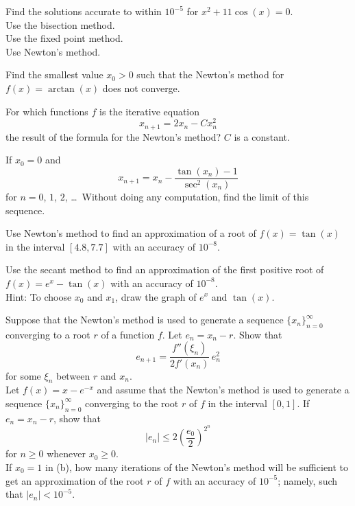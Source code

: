 \begin{question}
Find the solutions accurate to within $10^{-5}$ for $x^2 + 11\cos(x)=0$.\\
 Use the bisection method.\\
 Use the fixed point method.\\
 Use Newton's method.
\label{solvAQ7}
\end{question}

\begin{question}
Find the smallest value $x_0>0$ such that the Newton's method for
$f(x) = \arctan(x)$ does not converge.
\label{solvAQ8}
\end{question}

\begin{question}
For which functions $f$ is the iterative equation
\[
x_{n+1} = 2x_n - C x_n^2
\]
the result of the formula for the Newton's method?  $C$ is a
constant.
\label{solvAQ9}
\end{question}

\begin{question}
If $x_0 = 0$ and
\[
x_{n+1} = x_n - \frac{\tan(x_n) - 1}{\sec^2(x_n)}
\]
for $n=0$, $1$, $2$, \ldots\  Without doing any computation, find the
limit of this sequence.
\label{solvAQ10}
\end{question}

\begin{question}
Use Newton's method to find an approximation of a root of
$f(x) = \tan(x)$ in the interval $[4.8, 7.7]$ with an accuracy of
$10^{-8}$.
\label{solvAQ11}
\end{question}

\begin{question}
Use the secant method to find an approximation of the first positive
root of $f(x) = e^x - \tan(x)$ with an accuracy of $10^{-8}$.\\
Hint: To choose $x_0$ and $x_1$, draw the graph of $e^x$ and $\tan(x)$.
\label{solvAQ12}
\end{question}

\begin{question}
 Suppose that the Newton's method is used to generate a sequence
$\{x_n\}_{n=0}^\infty$ converging to a root $r$ of a function $f$. 
Let $e_n = x_n-r$.  Show that
\[
e_{n+1} = \frac{f''(\xi_n)}{2f'(x_n)}\, e_n^2
\]
for some $\xi_n$ between $r$ and $x_n$.\\
 Let $f(x) = x-e^{-x}$ and assume that the Newton's method is
used to generate a sequence $\{x_n\}_{n=0}^\infty$ converging to the
root $r$ of $f$ in the interval $[0,1]$.  If $e_n =x_n-r$, show that 
\begin{equation}\label{NMconvQuest}
|e_n| \leq 2\left(\frac{e_0}{2}\right)^{2^n}
\end{equation}
for $n \geq 0$ whenever $x_0\geq 0$.\\
 If $x_0=1$ in (b), how many iterations of the Newton's method
will be sufficient to get an approximation of the root $r$ of $f$ with
an accuracy of $10^{-5}$; namely, such that $|e_n| < 10^{-5}$.
\label{solvAQ13}
\end{question}


